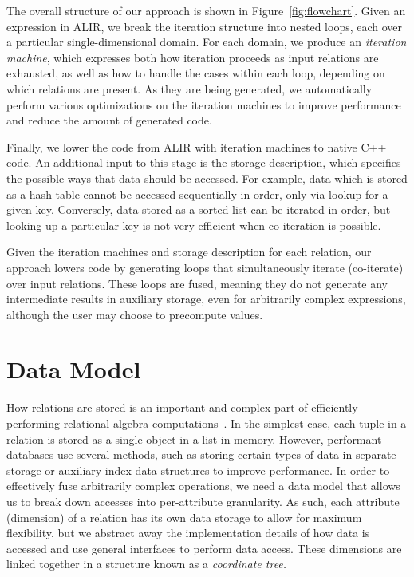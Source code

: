 \documentclass[acmsmall,screen,nonacm]{acmart}\settopmatter{printfolios=true,printccs=false,printacmref=false}
\begin{document}
The overall structure of our approach is shown in
Figure~\ref{fig:flowchart}.
Given an expression in ALIR, we break the iteration structure into
nested loops, each over a particular single-dimensional domain.
For each domain, we produce an \emph{iteration machine},
which expresses both how iteration proceeds as input relations are
exhausted, as well as how to handle the cases within each loop,
depending on which relations are present.
As they are being generated, we automatically perform
various optimizations on the iteration machines to improve performance
and reduce the amount of generated code.

Finally, we lower the code from ALIR with iteration machines to
native C++ code. An additional input to this stage is the storage
description,
which specifies the possible ways that data should be accessed. For
example, data which is stored as a hash table cannot be accessed
sequentially in order, only via lookup for a given key. Conversely,
data stored as a sorted list can be iterated in order, but looking up
a particular key is not very efficient when co-iteration is possible.

Given the iteration machines and storage description for each relation,
our approach lowers code by generating loops that
simultaneously iterate (co-iterate) over input relations.
These loops are fused, meaning
they do not generate any intermediate results in auxiliary storage,
even for arbitrarily complex expressions, although the user may choose to precompute values.



\section{Data Model}
\label{sec:data-model}

How relations are stored is an important and complex part of efficiently performing relational algebra computations~\cite{access-path,column-row}.
In the simplest case, each tuple in a relation is stored as a single object in a list in memory.
However, performant databases use several methods, such as storing certain types of data in separate storage or
auxiliary index data structures to improve performance.
In order to effectively fuse arbitrarily complex operations, we need a data model that allows us to
break down accesses into per-attribute granularity.
As such, each attribute (dimension) of a relation has its own data storage to allow for maximum flexibility,
but we abstract away the implementation details of how data is accessed and use general interfaces to perform data access.
These dimensions are linked together in a structure known as a \emph{coordinate tree.}
\end{document}
